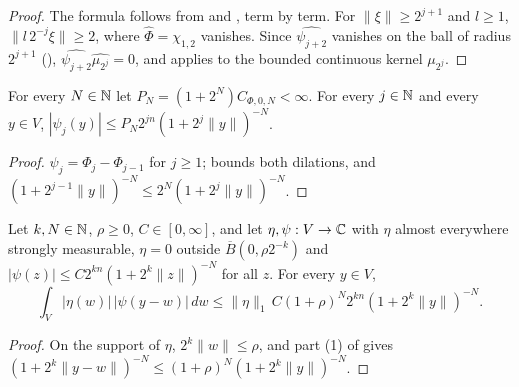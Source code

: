 \begin{proof}
\leanok
The formula follows from  and , term by term.
For $\|\xi\| \geq 2^{j+1}$ and $l \geq 1$, $\|l \, 2^{-j} \xi\| \geq 2$, where
$\widehat\Phi = \chi_{1,2}$ vanishes. Since $\widehat{\psi_{j+2}}$ vanishes on the ball of
radius $2^{j+1}$ (), $\widehat{\psi_{j+2}} \widehat{\mu_{2^j}} = 0$,
and  applies to the bounded continuous kernel $\mu_{2^j}$.
\end{proof}

\begin{lemma}
\label{lem:lp-blocks-decay}
\leanok
{}
For every $N \in \mathbb{N}$ let $P_N = (1 + 2^N) C_{\Phi,0,N} < \infty$. For every $j \in \mathbb{N}$ and every
$y \in V$, $|\psi_j(y)| \leq P_N 2^{jn} (1 + 2^j \|y\|)^{-N}$.
\end{lemma}

\begin{proof}
\leanok
$\psi_j = \Phi_j - \Phi_{j-1}$ for $j \geq 1$;  bounds both dilations,
and $(1 + 2^{j-1} \|y\|)^{-N} \leq 2^N (1 + 2^j \|y\|)^{-N}$.
\end{proof}

\begin{lemma}
\label{lem:small-support-decay}
\leanok
{}
Let $k, N \in \mathbb{N}$, $\rho \geq 0$, $C \in [0, \infty]$, and let $\eta, \psi : V \to \mathbb{C}$ with
$\eta$ almost everywhere strongly measurable, $\eta = 0$ outside $\overline B(0, \rho 2^{-k})$
and $|\psi(z)| \leq C 2^{kn} (1 + 2^k \|z\|)^{-N}$ for all $z$. For every $y \in V$,
\[
  \int_V |\eta(w)| \, |\psi(y - w)| \, dw \leq \|\eta\|_1 \, C (1 + \rho)^N 2^{kn}
  (1 + 2^k \|y\|)^{-N} .
\]
\end{lemma}

\begin{proof}
\leanok
On the support of $\eta$, $2^k \|w\| \leq \rho$, and part (1) of  gives
$(1 + 2^k \|y - w\|)^{-N} \leq (1 + \rho)^N (1 + 2^k \|y\|)^{-N}$.
\end{proof}

